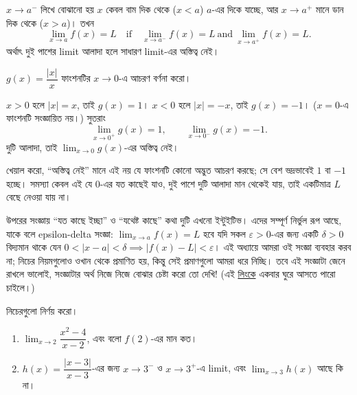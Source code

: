 \documentclass[11pt]{article}
\begin{document}
\begin{idea}
$x \to a^{-}$ লিখে বোঝানো হয় $x$ কেবল বাম দিক থেকে ($x < a$) $a$-এর দিকে
যাচ্ছে, আর $x \to a^{+}$ মানে ডান দিক থেকে ($x > a$)। তখন
\[
  \lim_{x \to a} f(x) = L
  \quad \mathrm{if} \quad
  \lim_{x \to a^{-}} f(x) = L
  \ \mathrm{and} \
  \lim_{x \to a^{+}} f(x) = L .
\]
অর্থাৎ দুই পাশের limit আলাদা হলে সাধারণ limit-এর অস্তিত্ব নেই।
\end{idea}

\begin{example}
$g(x) = \dfrac{|x|}{x}$ ফাংশনটির $x \to 0$-এ আচরণ বর্ণনা করো।
\end{example}

\begin{solbox}
$x > 0$ হলে $|x| = x$, তাই $g(x) = 1$। $x < 0$ হলে $|x| = -x$, তাই
$g(x) = -1$। ($x = 0$-এ ফাংশনটি সংজ্ঞায়িত নয়।) সুতরাং
\[
  \lim_{x \to 0^{+}} g(x) = 1, \qquad
  \lim_{x \to 0^{-}} g(x) = -1 .
\]
দুটি আলাদা, তাই $\lim_{x \to 0} g(x)$-এর অস্তিত্ব নেই।

খেয়াল করো, ``অস্তিত্ব নেই'' মানে এই নয় যে ফাংশনটি কোনো অদ্ভুত আচরণ করছে; সে
বেশ ভদ্রভাবেই $1$ বা $-1$ হচ্ছে। সমস্যা কেবল এই যে $0$-এর যত কাছেই যাও, দুই
পাশে দুটি আলাদা মান থেকেই যায়, তাই একটিমাত্র $L$ বেছে নেওয়া যায় না।
\end{solbox}

\begin{remark}
উপরের সংজ্ঞায় ``যত কাছে ইচ্ছা'' ও ``যথেষ্ট কাছে'' কথা দুটি এখনো ইন্টুইটিভ।
এদের সম্পূর্ণ নির্ভুল রূপ আছে, যাকে বলে epsilon-delta সংজ্ঞা: $\lim_{x \to a}f(x)=L$ হবে যদি সকল $\varepsilon>0$-এর জন্য একটি $\delta>0 $ বিদ্যমান থাকে যেন $0<\lvert x-a \rvert <\delta \implies \lvert f(x)-L \rvert <\varepsilon$। এই অধ্যায়ে আমরা ওই
সংজ্ঞা ব্যবহার করব না; নিচের নিয়মগুলোও ওখান থেকে প্রমাণিত হয়, কিন্তু সেই
প্রমাণগুলো আমরা ধরে নিচ্ছি। তবে এই সংজ্ঞাটা জেনে রাখলে ভালোই, সংজ্ঞাটার অর্থ নিজে নিজে বোঝার চেষ্টা করো তো দেখি! (এই \href{https://brilliant.org/wiki/epsilon-delta-definition-of-a-limit/}{লিংকে} একবার ঘুরে আসতে পারো চাইলে।) 
\end{remark}

 নিচেরগুলো নির্ণয় করো।
\begin{enumerate}
  \item $\lim_{x \to 2} \dfrac{x^{2}-4}{x-2}$, এবং বলো $f(2)$-এর মান কত।
  \item $h(x) = \dfrac{|x-3|}{x-3}$-এর জন্য $x \to 3^{-}$ ও $x \to 3^{+}$-এ
        limit, এবং $\lim_{x \to 3} h(x)$ আছে কি না।
\end{enumerate}
\end{document}
